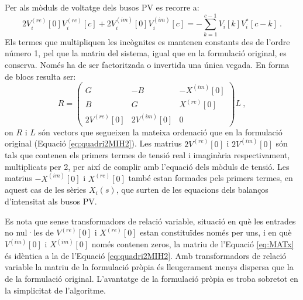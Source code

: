 Per als mòduls de voltatge dels busos PV es recorre a:
\begin{equation}
    2V^{(re)}_i[0]V^{(re)}_i[c]+2V^{(im)}_i[0]V^{(im)}_i[c]=-\sum_{k=1}^{c-1}V_i[k]V^*_i[c-k]\ .
        \label{eq:MPV6}
\end{equation}
Els termes que multipliquen les incògnites es mantenen constants des de l'ordre número 1, pel que la matriu del sistema, igual que en la formulació original, es conserva. Només ha de ser factoritzada o invertida una única vegada. En forma de blocs resulta ser:
\begin{equation}
    R = 
    \begin{pmatrix}
        G & -B & -X^{(im)}[0] \\
        B & G &  X^{(re)}[0] \\
        2V^{(re)}[0] & 2V^{(im)}[0] & 0 
    \end{pmatrix}L\ ,
    \label{eq:MATx}
\end{equation}
on $R$ i $L$ són vectors que segueixen la mateixa ordenació que en la formulació original (Equació \ref{eq:quadri2MIH2}). Les matrius $2V^{(re)}[0]$ i $2V^{(im)}[0]$ són tals que contenen els primers termes de tensió real i imaginària respectivament, multiplicats per 2, per així de complir amb l'equació dels mòduls de tensió. Les matrius $-X^{(im)}[0]$ i $X^{(re)}[0]$ també estan formades pels primers termes, en aquest cas de les sèries $X_i(s)$, que surten de les equacions dels balanços d'intensitat als busos PV. 

Es nota que sense transformadors de relació variable, situació en què les entrades no nul·les de $V^{(re)}[0]$ i $X^{(re)}[0]$ estan constituïdes només per uns, i en què $V^{(im)}[0]$ i $X^{(im)}[0]$ només contenen zeros, la matriu de l'Equació \ref{eq:MATx} és idèntica a la de l'Equació \ref{eq:quadri2MIH2}. Amb transformadors de relació variable la matriu de la formulació pròpia és lleugerament menys dispersa que la de la formulació original. L'avantatge de la formulació pròpia es troba sobretot en la simplicitat de l'algoritme. 